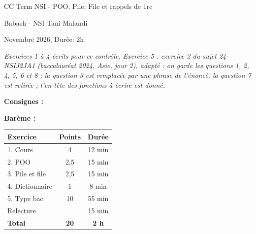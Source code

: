 \documentclass[a4paper, noanswers, addpoints, 12pt]{exam}
\begin{document}
\pagestyle{headandfoot}

\begin{center}
{\LARGE CC Term NSI - POO, Pile, File et rappels de 1re\par}\vspace{0.6em}
{\large Babash - NSI Tani Malandi\par}\vspace{0.4em}
{\large Novembre 2026, Durée: 2h\par}
\end{center}
\thispagestyle{headandfoot}
\begin{center}\footnotesize\itshape Exercices 1 à 4 écrits pour ce contrôle. Exercice 5 : exercice 2 du sujet 24-NSIJ2JA1 (baccalauréat 2024, Asie, jour 2), adapté : on garde les questions 1, 2, 4, 5, 6 et 8 ; la question 3 est remplacée par une phrase de l'énoncé, la question 7 est retirée ; l'en-tête des fonctions à écrire est donné.\end{center}

\noindent\begin{minipage}[t]{0.55\linewidth}\vspace{0pt}
\textbf{\large Consignes :}\par\smallskip
{}
\end{minipage}\hfill
\begin{minipage}[t]{0.42\linewidth}\vspace{0pt}
\textbf{\large Barème :}\par\smallskip
\small
\begin{tabular}{|l|c|c|}\hline
\textbf{Exercice} & \textbf{Points} & \textbf{Durée} \\\hline
1. Cours & 4 & 12 min \\\hline
2. POO & 2,5 & 15 min \\\hline
3. Pile et file & 2,5 & 15 min \\\hline
4. Dictionnaire & 1 & 8 min \\\hline
5. Type bac & 10 & 55 min \\\hline
Relecture &  & 15 min \\\hline
\textbf{Total} & \textbf{20} & \textbf{2 h} \\\hline
\end{tabular}
\end{minipage}
\end{document}
